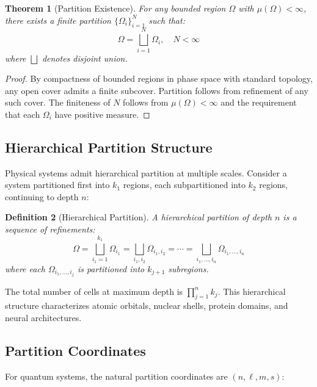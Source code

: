 \documentclass[twocolumn,amsmath,amssymb,aps,prl,superscriptaddress]{revtex4-2}
\newtheorem{theorem}{Theorem}[section]
\newtheorem{definition}[theorem]{Definition}
\begin{document}
\begin{theorem}[Partition Existence]
\label{thm:partition}
For any bounded region $\Omega$ with $\mu(\Omega) < \infty$, there exists a finite partition $\{\Omega_i\}_{i=1}^{N}$ such that:
\begin{equation}
\Omega = \bigsqcup_{i=1}^{N} \Omega_i, \quad N < \infty
\end{equation}
where $\bigsqcup$ denotes disjoint union.
\end{theorem}

\begin{proof}
By compactness of bounded regions in phase space with standard topology, any open cover admits a finite subcover. Partition follows from refinement of any such cover. The finiteness of $N$ follows from $\mu(\Omega) < \infty$ and the requirement that each $\Omega_i$ have positive measure.
\end{proof}

\subsection{Hierarchical Partition Structure}

Physical systems admit hierarchical partition at multiple scales. Consider a system partitioned first into $k_1$ regions, each subpartitioned into $k_2$ regions, continuing to depth $n$:

\begin{definition}[Hierarchical Partition]
A hierarchical partition of depth $n$ is a sequence of refinements:
\begin{equation}
\Omega = \bigsqcup_{i_1=1}^{k_1} \Omega_{i_1} = \bigsqcup_{i_1,i_2} \Omega_{i_1,i_2} = \cdots = \bigsqcup_{i_1,\ldots,i_n} \Omega_{i_1,\ldots,i_n}
\end{equation}
where each $\Omega_{i_1,\ldots,i_j}$ is partitioned into $k_{j+1}$ subregions.
\end{definition}

The total number of cells at maximum depth is $\prod_{j=1}^{n} k_j$. This hierarchical structure characterizes atomic orbitals, nuclear shells, protein domains, and neural architectures.

\subsection{Partition Coordinates}

For quantum systems, the natural partition coordinates are $(n, \ell, m, s)$:
\end{document}

